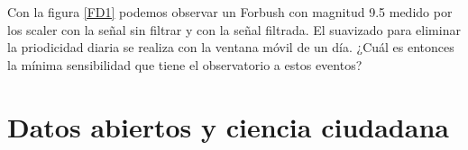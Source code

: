 
Con la figura \ref{FD1} podemos observar un Forbush con magnitud 9.5 medido por los scaler con la señal sin filtrar y con la señal filtrada. El suavizado para eliminar la priodicidad diaria se realiza con la ventana móvil de un día. ¿Cuál es entonces la mínima sensibilidad que tiene el observatorio a estos eventos?




\section{Datos abiertos y ciencia ciudadana}
